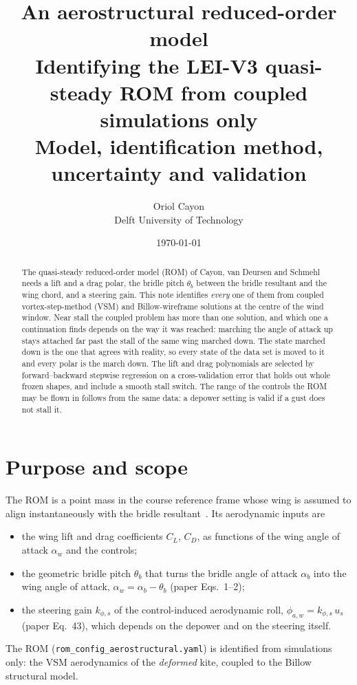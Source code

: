 \documentclass[11pt,a4paper]{article}
\title{%
  \vspace{-1.5cm}
  {\Huge\textbf{An aerostructural reduced-order model}}\\[6pt]
  {\large Identifying the LEI-V3 quasi-steady ROM from coupled simulations
   only}\\[10pt]
  {\normalsize Model, identification method, uncertainty and validation}
}
\author{Oriol Cayon \\ \small Delft University of Technology}
\date{\today}
\newcommand{\code}[1]{\texttt{\small #1}}
\begin{document}
\maketitle
\thispagestyle{fancy}

\begin{abstract}
\noindent
The quasi-steady reduced-order model (ROM) of Cayon, van Deursen and
Schmehl~\cite{cayon2026rom} needs a lift and a drag polar, the bridle pitch
$\theta_b$ between the bridle resultant and the wing chord, and a steering gain.
This note identifies \emph{every} one of them from coupled vortex-step-method
(VSM) and Billow-wireframe solutions at the centre of the wind window. Near
stall the coupled problem has more than one solution, and which one a
continuation finds depends on the way it was reached: marching the angle of
attack up stays attached far past the stall of the same wing marched down. The
state marched down is the one that agrees with reality, so every state of the
data set is moved to it and every polar is the march down. The lift and drag
polynomials are selected by forward--backward stepwise regression on a
cross-validation error that holds out whole frozen shapes, and include a smooth
stall switch. The range of the controls the ROM may be flown in follows from
the same data: a depower setting is valid if a gust does not stall it.
\end{abstract}

\tableofcontents

\section{Purpose and scope}

The ROM is a point mass in the course reference frame whose wing is assumed to
align instantaneously with the bridle resultant~\cite{cayon2026rom}. Its
aerodynamic inputs are
\begin{itemize}
  \item the wing lift and drag coefficients $C_L$, $C_D$, as functions of the
        wing angle of attack $\alpha_w$ and the controls;
  \item the geometric bridle pitch $\theta_b$ that turns the bridle angle of
        attack $\alpha_b$ into the wing angle of attack,
        $\alpha_w=\alpha_b-\theta_b$ (paper Eqs.~1--2);
  \item the steering gain $k_{\phi,s}$ of the control-induced aerodynamic roll,
        $\phi_{a,w}=k_{\phi,s}\,u_s$ (paper Eq.~43), which depends on the depower and
        on the steering itself.
\end{itemize}
The ROM (\code{rom\_config\_aerostructural.yaml}) is identified from simulations
only: the VSM aerodynamics of the \emph{deformed} kite, coupled to the Billow
structural model.
\end{document}
